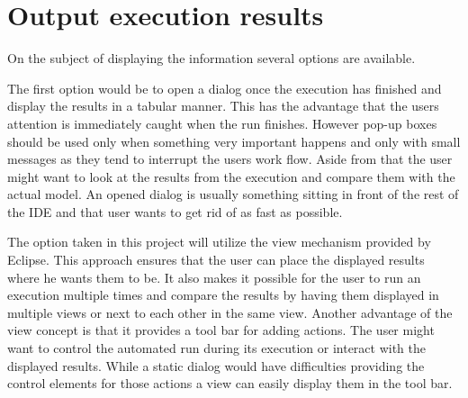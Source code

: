 \section{Output execution results}
\label{section:AutoConceptsOutput}
On the subject of displaying the information several options are available.

The first option would be to open a dialog once the execution has finished
and display the results in a tabular manner. This has the advantage that the
users attention is immediately caught when the run finishes. However pop-up boxes
should be used only when something very important happens and only with small messages
as they tend to interrupt the users work flow. Aside from that the user might want
to look at the results from the execution and compare them with the actual model.
An opened dialog is usually something sitting in front of the rest of the \ac{IDE}
and that user wants to get rid of as fast as possible.

The option taken in this project will utilize the view mechanism provided by Eclipse. %
This approach ensures that the user can place the displayed results where he wants them to be.
It also makes it possible for the user to run an execution multiple times and compare the
results by having them displayed in multiple views or next to each other in the same view.
Another advantage of the view concept is that it provides a tool bar for adding actions.
The user might want to control the automated run during its execution or interact with
the displayed results. While a static dialog would have difficulties providing the control elements
for those actions a view can easily display them in the tool bar.
